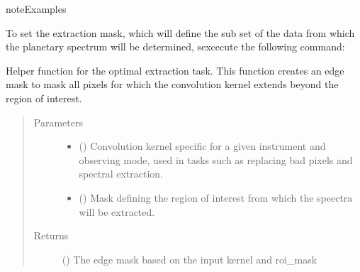 \documentclass[a4paper,10pt,english]{sphinxmanual}
\begin{document}
\begin{fulllineitems}
\begin{fulllineitems}
\begin{sphinxadmonition}{note}{Examples}

To set the extraction mask, which will define the sub set of the data
from which the planetary spectrum will be determined, sexcecute the
following command:

%
\begin{sphinxVerbatim}[commandchars=\\\{\}]
\end{sphinxVerbatim}
\end{sphinxadmonition}

\end{fulllineitems}


\begin{fulllineitems}
\label{\detokenize{cascade.TSO:cascade.TSO.TSO.TSOSuite._create_edge_mask}}
Helper function for the optimal extraction task. This function
creates an edge mask to mask all pixels for which the convolution
kernel extends beyond the region of interest.
\begin{quote}\begin{description}
\item[{Parameters}] \leavevmode\begin{itemize}
\item {} 
 () \textendash{} Convolution kernel specific for a given instrument and observing
mode, used in tasks such as replacing bad pixels and
spectral extraction.

\item {} 
 () \textendash{} Mask defining the region of interest from which the speectra will
be extracted.

\end{itemize}

\item[{Returns}] \leavevmode
{} () \textendash{} The edge mask based on the input kernel and roi\_mask


\end{description}
\end{quote}
\end{fulllineitems}
\end{fulllineitems}
\end{document}
